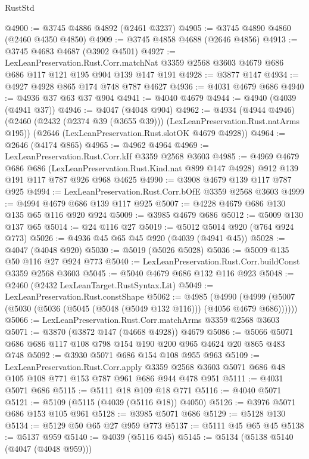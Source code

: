 \begin{lexlean}{RustStd}
\begin{coremodule}
@4900 := @3745 @4886 @4892 (@2461 @3237)
@4905 := @3745 @4890 @4860 (@2460 @4350 @4850)
@4909 := @3745 @4858 @4688 (@2646 @4856)
@4913 := @3745 @4683 @4687 (@3902 @4501)
@4927 := LexLeanPreservation.Rust.Corr.matchNat
    @3359
    @2568
    @3603
    @4679
    @686
    @686
    @117
    @121
    @195
    @904
    @139
    @147
    @191
@4928 := @3877 @147
@4934 := @4927 @4928 @865 @174 @748 @787 @4627
@4936 := @4031 @4679 @686
@4940 := @4936 @37 @63 @37 @904
@4941 := @4040 @4679
@4944 := @4940 (@4039 (@4941 @37))
@4946 := @4047 (@4048 @904)
@4962 := @4934
    (@4944 @4946)
    (@2460 (@2432 (@2374 @39 (@3655 @39))) (LexLeanPreservation.Rust.natArms @195))
    (@2646 (LexLeanPreservation.Rust.slotOK @4679 @4928))
@4964 := @2646 (@4174 @865)
@4965 := @4962 @4964
@4969 := LexLeanPreservation.Rust.Corr.kIf @3359 @2568 @3603
@4985 := @4969
    @4679
    @686
    @686
    (LexLeanPreservation.Rust.Kind.nat @899 @147 @4928)
    @912
    @139
    @191
    @117
    @787
    @926
    @968
    @4625
@4990 := @3908 @4679 @139 @117 @787 @925
@4994 := LexLeanPreservation.Rust.Corr.bOfE @3359 @2568 @3603
@4999 := @4994 @4679 @686 @139 @117 @925
@5007 := @4228 @4679 @686 @130 @135 @65 @116 @920 @924
@5009 := @3985 @4679 @686
@5012 := @5009 @130 @137 @65
@5014 := @24 @116 @27
@5019 := @5012 @5014 @920 (@764 @924 @773)
@5026 := @4936 @45 @65 @45 @920 (@4039 (@4941 @45))
@5028 := @4047 (@4048 @920)
@5030 := @5019 (@5026 @5028)
@5036 := @5009 @135 @50 @116 @27 @924 @773
@5040 := LexLeanPreservation.Rust.Corr.buildConst @3359 @2568 @3603
@5045 := @5040 @4679 @686 @132 @116 @923
@5048 := @2460 (@2432 LexLeanTarget.RustSyntax.Lit)
@5049 := LexLeanPreservation.Rust.constShape
@5062 := @4985
    (@4990 (@4999 (@5007 (@5030 (@5036 (@5045 (@5048 (@5049 @132 @116))) (@4056 @4679 @686))))))
@5066 := LexLeanPreservation.Rust.Corr.matchArms @3359 @2568 @3603
@5071 := @3870 (@3872 @147 (@4668 @4928)) @4679
@5086 := @5066 @5071 @686 @686 @117 @108 @798 @154 @190 @200 @965 @4624 @20 @865 @483 @748
@5092 := @3930 @5071 @686 @154 @108 @955 @963
@5109 := LexLeanPreservation.Rust.Corr.apply
    @3359
    @2568
    @3603
    @5071
    @686
    @48
    @105
    @108
    @771
    @153
    @787
    @961
    @686
    @944
    @478
    @951
@5111 := @4031 @5071 @686
@5115 := @5111 @18 @109 @18 @771
@5116 := @4040 @5071
@5121 := @5109 (@5115 (@4039 (@5116 @18)) @4050)
@5126 := @3976 @5071 @686 @153 @105 @961
@5128 := @3985 @5071 @686
@5129 := @5128 @130
@5134 := @5129 @50 @65 @27 @959 @773
@5137 := @5111 @45 @65 @45
@5138 := @5137 @959
@5140 := @4039 (@5116 @45)
@5145 := @5134 (@5138 @5140 (@4047 (@4048 @959)))

\end{coremodule}
\end{lexlean}
